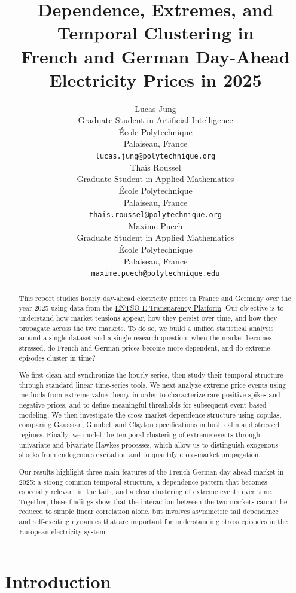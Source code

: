 \documentclass[11pt, a4paper]{article}
\title{Dependence, Extremes, and Temporal Clustering in\\
French and German Day-Ahead Electricity Prices in 2025}
\author{
    Lucas Jung \\
    Graduate Student in Artificial Intelligence \\
    École Polytechnique \\
    Palaiseau, France \\
    \texttt{lucas.jung@polytechnique.org} \\
    \And
    Thaïs Roussel \\
    Graduate Student in Applied Mathematics \\
    École Polytechnique \\
    Palaiseau, France \\
    \texttt{thais.roussel@polytechnique.org} \\
    \And
    Maxime Puech \\
    Graduate Student in Applied Mathematics \\
    École Polytechnique \\
    Palaiseau, France \\
    \texttt{maxime.puech@polytechnique.edu} \\
}
\theoremstyle{remark}
\begin{document}
\maketitle
\pagestyle{main}

\begin{abstract}
This report studies hourly day-ahead electricity prices in France and Germany over the year 2025 using data from the \href{https://transparency.entsoe.eu/fileLibrary/fileBrowserMode?appState=%7B%22path%22%3A%22%2FTP_export%2FEnergyPrices_12.1.D_r3%2F%22%7D}{ENTSO-E Transparency Platform}. Our objective is to understand how market tensions appear, how they persist over time, and how they propagate across the two markets. To do so, we build a unified statistical analysis around a single dataset and a single research question: when the market becomes stressed, do French and German prices become more dependent, and do extreme episodes cluster in time?

We first clean and synchronize the hourly series, then study their temporal structure through standard linear time-series tools. We next analyze extreme price events using methods from extreme value theory in order to characterize rare positive spikes and negative prices, and to define meaningful thresholds for subsequent event-based modeling. We then investigate the cross-market dependence structure using copulas, comparing Gaussian, Gumbel, and Clayton specifications in both calm and stressed regimes. Finally, we model the temporal clustering of extreme events through univariate and bivariate Hawkes processes, which allow us to distinguish exogenous shocks from endogenous excitation and to quantify cross-market propagation.

Our results highlight three main features of the French-German day-ahead market in 2025: a strong common temporal structure, a dependence pattern that becomes especially relevant in the tails, and a clear clustering of extreme events over time. Together, these findings show that the interaction between the two markets cannot be reduced to simple linear correlation alone, but involves asymmetric tail dependence and self-exciting dynamics that are important for understanding stress episodes in the European electricity system.
\end{abstract}

\section{Introduction}
\label{sec:intro}

\end{document}
